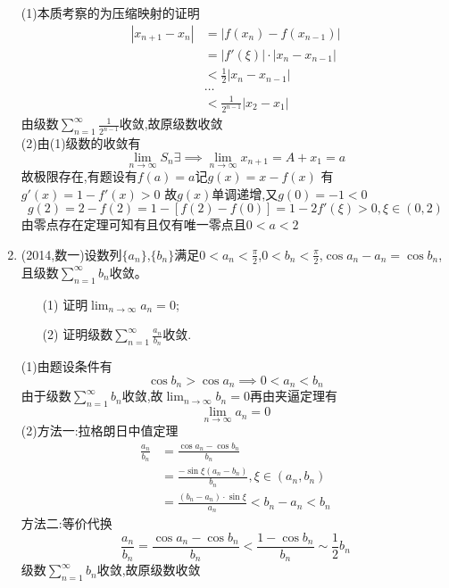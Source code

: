 \documentclass[12pt, a4paper, oneside, UTF8]{ctexbook}
\begin{document}
\begin{enumerate}[label=\arabic*.,start=12]
    \begin{solution}
    (1)本质考察的为压缩映射的证明 
    \begin{align*}
        \left|x_{n+1}-x_n\right| &= \left|f(x_n)-f(x_{n-1})\right| \\
        &=\left|f'(\xi)\right|\cdot\left|x_n-x_{n-1}\right| \\
        &<\frac{1}{2}\left|x_n-x_{n-1}\right| \\
        &\ldots \\
        &<\frac{1}{2^{n-1}}\left|x_2-x_1\right|
    \end{align*}
    由级数$\displaystyle \sum_{n=1}^{\infty}\frac{1}{2^{n-1}}$收敛,故原级数收敛 \\
    (2)由(1)级数的收敛有 
    $$
    \lim_{n\to\infty}S_n\exists \implies \lim_{n\to\infty}x_{n+1}=A+x_1=a
    $$
    故极限存在,有题设有$f(a) = a$记$g(x) = x - f(x)$ 有$g'(x)=1-f'(x) > 0$ 故$g(x)$单调递增,又$g(0)=-1<0$ 
    $$
    g(2) = 2 - f(2) = 1 - \left[f(2) - f(0)\right] = 1 - 2f'(\xi) > 0, \xi\in(0,2)
    $$
    由零点存在定理可知有且仅有唯一零点且$0<a<2$
    \end{solution}
    
    \item (2014,数一)设数列$\{a_n\}$,$\{b_n\}$满足$0<a_n<\frac{\pi}{2}$,$0<b_n<\frac{\pi}{2}$,$\cos a_n-a_n=\cos b_n$,且级数$\displaystyle \sum_{n=1}^{\infty} b_n$收敛。
    \begin{enumerate}[label=(\roman*)]
        \item[(1)] 证明$\displaystyle\lim_{n\rightarrow\infty} a_n=0$;
        \item[(2)] 证明级数$\displaystyle\sum_{n=1}^{\infty}\frac{a_n}{b_n}$收敛.
    \end{enumerate}
    
    \begin{solution}
    (1)由题设条件有
    $$
    \cos{b_n} > \cos{a_n} \implies 0 < a_n < b_n
    $$ 
    由于级数$\displaystyle\sum_{n=1}^{\infty}b_n$收敛,故$\displaystyle \lim_{n\to\infty}b_n=0$再由夹逼定理有 
    $$
    \lim_{n\to\infty}a_n=0
    $$
    (2)方法一:拉格朗日中值定理 
    \begin{align*}
        \frac{a_n}{b_n} &= \frac{\cos{a_n}-\cos{b_n}}{b_n}  \\
        &= \frac{-\sin\xi(a_n-b_n)}{b_n}, \xi\in(a_n,b_n) \\
        &= \frac{(b_n-a_n)\cdot\sin\xi}{a_n} < b_n - a_n < b_n
    \end{align*}
    方法二:等价代换 
    $$
    \frac{a_n}{b_n}=\frac{\cos{a_n}-\cos{b_n}}{b_n} < \frac{1-\cos{b_n}}{b_n} \sim \frac{1}{2}b_n
    $$
    级数$\displaystyle\sum_{n=1}^{\infty}b_n$收敛,故原级数收敛
    \end{solution}
\end{enumerate}
\end{document}
